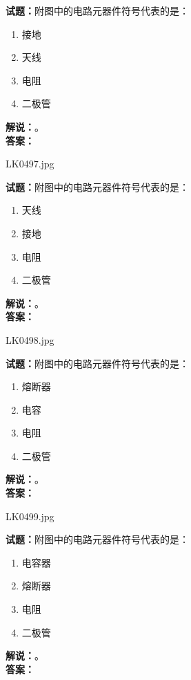 \documentclass{ctexbook}
\begin{document}
\vspace{\baselineskip}

\noindent\textbf{试题：}附图中的电路元器件符号代表的是：
\begin{enumerate}[leftmargin=3em]
  \item 接地
  \item 天线
  \item 电阻
  \item 二极管
\end{enumerate}
\noindent\textbf{解说：}\textbf{}。\\\noindent\textbf{答案：}

\vspace{\baselineskip}

LK0497.jpg

\noindent\textbf{试题：}附图中的电路元器件符号代表的是：
\begin{enumerate}[leftmargin=3em]
  \item 天线
  \item 接地
  \item 电阻
  \item 二极管
\end{enumerate}
\noindent\textbf{解说：}\textbf{}。\\\noindent\textbf{答案：}

\vspace{\baselineskip}

LK0498.jpg

\noindent\textbf{试题：}附图中的电路元器件符号代表的是：
\begin{enumerate}[leftmargin=3em]
  \item 熔断器
  \item 电容
  \item 电阻
  \item 二极管
\end{enumerate}
\noindent\textbf{解说：}\textbf{}。\\\noindent\textbf{答案：}

\vspace{\baselineskip}

LK0499.jpg

\noindent\textbf{试题：}附图中的电路元器件符号代表的是：
\begin{enumerate}[leftmargin=3em]
  \item 电容器
  \item 熔断器
  \item 电阻
  \item 二极管
\end{enumerate}
\noindent\textbf{解说：}\textbf{}。\\\noindent\textbf{答案：}
\end{document}
